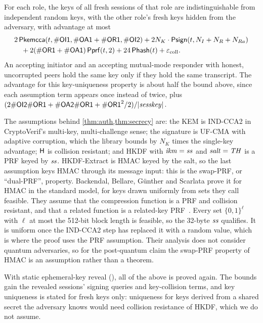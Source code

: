 \begin{theorem}\label{thm:secrecy}
For each role, the keys of all fresh sessions of that role are
indistinguishable from independent random keys, with the other role's fresh
keys hidden from the adversary, with advantage at most
\[
\begin{aligned}
  &2\,\mathsf{Pkemcca}(t, \#\mathsf{OI1}, \#\mathsf{OA1} + \#\mathsf{OR1}, \#\mathsf{OI2})
   + 2 N_K \cdot \mathsf{Psign}(t, N_I + N_R + N_{Ra})\\
  &\quad + 2(\#\mathsf{OR1} + \#\mathsf{OA1})\,\mathsf{Pprf}(t, 2)
   + 24\,\mathsf{Phash}(t) + \varepsilon_{\mathrm{coll}}.
\end{aligned}
\]
An accepting initiator and an accepting mutual-mode responder with honest,
uncorrupted peers hold the same key only if they hold the same transcript.
The advantage for this key-uniqueness property is about half the bound
above, since each assumption term appears once instead of twice, plus
$(2\#\mathsf{OI2}\#\mathsf{OR1} + \#\mathsf{OA2}\#\mathsf{OR1} + \#\mathsf{OR1}^2/2)/|\mathit{sesskey}|$.
\end{theorem}

The assumptions behind \cref{thm:auth,thm:secrecy} are: the KEM is IND-CCA2
in CryptoVerif's multi-key, multi-challenge sense; the signature is UF-CMA
with adaptive corruption, which the library bounds by $N_K$ times the
single-key advantage; $\mathsf{H}$ is collision resistant; and HKDF with
$\mathit{ikm} = \mathit{ss}$ and $\mathit{salt} = \mathit{TH}$ is a PRF keyed by $\mathit{ss}$.
HKDF-Extract is HMAC keyed by the salt, so the last assumption keys HMAC
through its message input: this is the swap-PRF, or ``dual-PRF'', property.
Backendal, Bellare, G\"unther and Scarlata prove it for HMAC in the standard
model, for keys drawn uniformly from sets they call feasible. They assume
that the compression function is a PRF and collision resistant, and that a
related function is a related-key PRF~\cite{BBGS23}. Every set
$\{0,1\}^\ell$ with $\ell$ at most the 512-bit block length is feasible, so
the 32-byte $\mathit{ss}$ qualifies. It is uniform once the IND-CCA2 step has
replaced it with a random value, which is where the proof uses the PRF
assumption. Their analysis does not consider quantum adversaries, so for the
post-quantum claim the swap-PRF property of HMAC is an assumption rather
than a theorem.

With static ephemeral-key reveal (), all of
the above is proved again. The bounds gain the revealed sessions'
signing queries and key-collision terms, and key uniqueness is stated for
fresh keys only: uniqueness for keys derived from a shared secret the
adversary knows would need collision resistance of HKDF, which we do not
assume.

